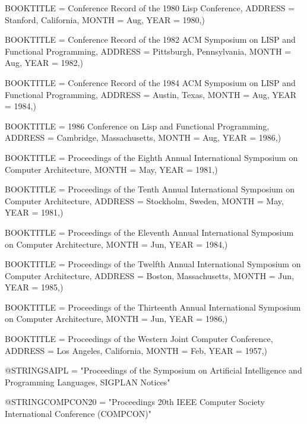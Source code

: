     BOOKTITLE = {Conference Record of the 1980 Lisp Conference},
    ADDRESS = {Stanford, California},
    MONTH = Aug,
    YEAR = {1980},)
    
    BOOKTITLE = {Conference Record of the 1982 ACM Symposium on LISP
       	         and Functional Programming},
    ADDRESS = {Pittsburgh, Pennsylvania},		 
    MONTH = Aug,
    YEAR = {1982},)
    
    BOOKTITLE = {Conference Record of the 1984 ACM Symposium on LISP
       	         and Functional Programming},
    ADDRESS = {Austin, Texas},
    MONTH = Aug,
    YEAR = {1984},)

    BOOKTITLE = {1986 Conference on Lisp and Functional Programming},
    ADDRESS = {Cambridge, Massachusetts},
    MONTH = Aug,
    YEAR = {1986},)
    
    BOOKTITLE = {Proceedings of the Eighth Annual International 
		 Symposium on Computer Architecture},
    MONTH = May,
    YEAR = {1981},)
    
    BOOKTITLE = {Proceedings of the Tenth Annual International
		  Symposium on Computer Architecture},
    ADDRESS = {Stockholm, Sweden},		 
    MONTH = May,
    YEAR = {1981},)
    
    BOOKTITLE = {Proceedings of the Eleventh Annual International
		 Symposium on Computer Architecture},
    MONTH = Jun,
    YEAR = {1984},)
    
    BOOKTITLE = {Proceedings of the Twelfth Annual International
		  Symposium on Computer Architecture},
    ADDRESS = {Boston, Massachusetts},		 
    MONTH = Jun,
    YEAR = {1985},)
    
    BOOKTITLE = {Proceedings of the Thirteenth Annual International
		 Symposium on Computer Architecture},
    MONTH = Jun,
    YEAR = {1986},)

    BOOKTITLE = {Proceedings of the Western Joint Computer Conference},
    ADDRESS = {Los Angeles, California},
    MONTH = Feb,
    YEAR = {1957},)
    

@STRING{SAIPL = "Proceedings of the Symposium on Artificial
Intelligence and Programming Languages, SIGPLAN Notices"}

@STRING{COMPCON20 = "Proceedings 20th {IEEE} Computer Society International
Conference ({COMPCON})"}

